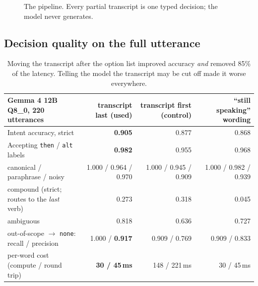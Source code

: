 \documentclass[11pt,a4paper]{article}
\newcommand{\code}[1]{\texttt{#1}}
\begin{document}
\begin{figure}[H]
\centering
{}
\caption{The pipeline. Every partial transcript is one typed decision; the model never generates.}
\end{figure}

\subsection{Decision quality on the full utterance}
\begin{table}[H]
\centering\small
\begin{tabular}{l r r r}
\toprule
Gemma 4 12B Q8\_0, 220 utterances & transcript last (used) & transcript first (control) & ``still speaking'' wording \\
\midrule
Intent accuracy, strict & \textbf{0.905} & 0.877 & 0.868 \\
Accepting \code{then} / \code{alt} labels & \textbf{0.982} & 0.955 & 0.968 \\
canonical / paraphrase / noisy & 1.000 / 0.964 / 0.970 & 1.000 / 0.945 / 0.909 & 1.000 / 0.982 / 0.939 \\
compound (strict; routes to the \emph{last} verb) & 0.273 & 0.318 & 0.045 \\
ambiguous & 0.818 & 0.636 & 0.727 \\
out-of-scope $\to$ \code{none}: recall / precision & 1.000 / \textbf{0.917} & 0.909 / 0.769 & 0.909 / 0.833 \\
per-word cost (compute / round trip) & \textbf{30 / 45\,ms} & 148 / 221\,ms & 30 / 45\,ms \\
\bottomrule
\end{tabular}
\caption{Moving the transcript after the option list improved accuracy \emph{and} removed 85\% of the latency. Telling the model the transcript may be cut off made it worse everywhere.}
\end{table}
\end{document}
